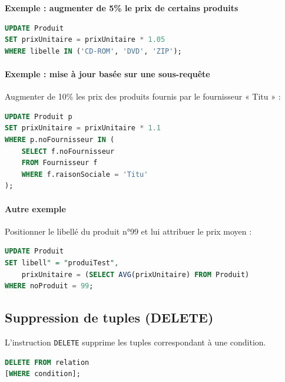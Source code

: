 \textbf{Exemple : augmenter de 5\% le prix de certains produits}

\begin{sqlcodebox}
\begin{lstlisting}[language=SQL]
UPDATE Produit
SET prixUnitaire = prixUnitaire * 1.05
WHERE libelle IN ('CD-ROM', 'DVD', 'ZIP');
\end{lstlisting}
\end{sqlcodebox}

\paragraph{Exemple : mise à jour basée sur une sous-requête}

Augmenter de 10\% les prix des produits fournis par le fournisseur « Titu » :

\begin{sqlcodebox}
\begin{lstlisting}[language=SQL]
UPDATE Produit p
SET prixUnitaire = prixUnitaire * 1.1
WHERE p.noFournisseur IN (
    SELECT f.noFournisseur
    FROM Fournisseur f
    WHERE f.raisonSociale = 'Titu'
);
\end{lstlisting}
\end{sqlcodebox}

\paragraph{Autre exemple}

Positionner le libellé du produit n°99 et lui attribuer le prix moyen :

\begin{sqlcodebox}
\begin{lstlisting}[language=SQL]
UPDATE Produit
SET libell" = "produiTest",
    prixUnitaire = (SELECT AVG(prixUnitaire) FROM Produit)
WHERE noProduit = 99;
\end{lstlisting}
\end{sqlcodebox}

\subsection{Suppression de tuples (DELETE)}

L’instruction \texttt{DELETE} supprime les tuples correspondant à une condition.

\begin{sqlcodebox}
\begin{lstlisting}[language=SQL]
DELETE FROM relation
[WHERE condition];
\end{lstlisting}
\end{sqlcodebox}

